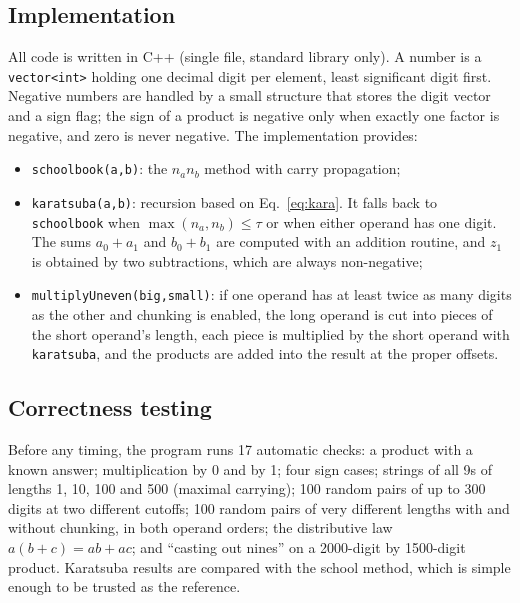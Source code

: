 \documentclass[11pt,a4paper]{article}
\begin{document}
\subsection{Implementation}
All code is written in C++ (single file, standard library only). A number is a \texttt{vector<int>} holding one decimal digit per element, least significant digit first. Negative numbers are handled by a small structure that stores the digit vector and a sign flag; the sign of a product is negative only when exactly one factor is negative, and zero is never negative. The implementation provides:
\begin{itemize}[nosep]
  \item \texttt{schoolbook(a,b)}: the $n_an_b$ method with carry propagation;
  \item \texttt{karatsuba(a,b)}: recursion based on Eq.~\eqref{eq:kara}. It falls back to \texttt{schoolbook} when $\max(n_a,n_b)\le\tau$ or when either operand has one digit. The sums $a_0+a_1$ and $b_0+b_1$ are computed with an addition routine, and $z_1$ is obtained by two subtractions, which are always non-negative;
  \item \texttt{multiplyUneven(big,small)}: if one operand has at least twice as many digits as the other and chunking is enabled, the long operand is cut into pieces of the short operand's length, each piece is multiplied by the short operand with \texttt{karatsuba}, and the products are added into the result at the proper offsets.
\end{itemize}

\subsection{Correctness testing}
Before any timing, the program runs 17 automatic checks: a product with a known answer; multiplication by 0 and by 1; four sign cases; strings of all 9s of lengths 1, 10, 100 and 500 (maximal carrying); 100 random pairs of up to 300 digits at two different cutoffs; 100 random pairs of very different lengths with and without chunking, in both operand orders; the distributive law $a(b+c)=ab+ac$; and ``casting out nines'' on a 2000-digit by 1500-digit product. Karatsuba results are compared with the school method, which is simple enough to be trusted as the reference.
\end{document}
